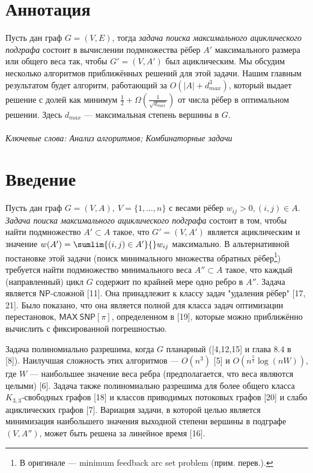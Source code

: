 \documentclass[a4paper, 12pt, oneside]{extarticle}  %
\begin{document}

\section*{Аннотация}

Пусть дан граф $G = (V, E)$, тогда \textit{задача поиска максимального ациклического подграфа} состоит в вычислении подмножества рёбер $A'$ максимального размера или общего веса так, чтобы $G'=(V, A')$ был ациклическим. Мы обсудим несколько алгоритмов приближённых решений для этой задачи. Нашим главным результатом будет алгоритм, работающий за  $O(|A| + d_{max}^3)$, который выдает решение с долей как минимум
$\frac{1}{2} + \Omega(\frac{1}{\sqrt{d_{max}}})$ от числа рёбер в оптимальном решении. Здесь $d_{max}$ --- максимальная степень вершины в $G$.
\\
\\
\small\textit{Ключевые слова: Анализ алгоритмов; Комбинаторные задачи}



\section{Введение}

Пусть дан граф $G = (V, A),\ V = \{1,\ldots, n\}$ с весами рёбер $w_{ij} > 0, (i, j) \in A$. \textit{Задача поиска максимального ациклического подграфа} состоит в том, чтобы найти подмножество $A' \subset A$ такое, что $G' = (V, A')$ является ациклическим и значение $w(A') = \sumlim{(i,j)\in A'}{} w_{ij}$ максимально. В альтернативной постановке этой задачи (поиск минимального множества обратных рёбер\footnote{В оригинале --- minimum feedback arc set problem (прим. перев.).}) требуется найти подмножество минимального веса $A'' \subset A$ такое, что каждый (направленный) цикл $G$ содержит по крайней мере одно ребро в $A''$. Задача является $\mathsf{NP}$-сложной [11]. Она принадлежит к классу задач "удаления рёбер" [17, 21]. Было показано, что она является полной для класса задач оптимизации перестановок,
$\mathsf{MAX\ SNP}[\pi]$, определенном в [19], которые можно приближённо вычислить с фиксированной погрешностью.

Задача полиномиально разрешима, когда $G$ планарный ([4,12,15] и глава 8.4 в [8]). Наилучшая сложность этих алгоритмов --- $O(n^3)$ [5] и $O(n^{\frac{5}{2}} \log(nW))$, где $W$ --- наибольшее значение веса ребра (предполагается, что веса являются целыми) [6]. Задача также полиномиально разрешима для более общего класса $K_{3,3}$-свободных графов [18] и классов приводимых потоковых графов [20] и слабо ациклических графов [7]. Вариация задачи, в которой целью является минимизация наибольшего значения выходной степени вершины в подграфе $(V,A'')$, может быть решена за линейное время [16].
\end{document}

